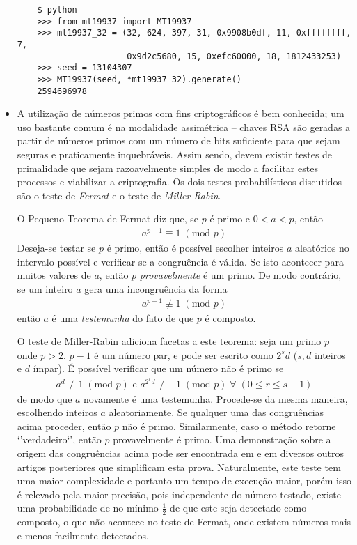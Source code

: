 \documentclass{article}
\begin{document}
\begin{itemize}
\begin{verbatim}
    $ python
    >>> from mt19937 import MT19937
    >>> mt19937_32 = (32, 624, 397, 31, 0x9908b0df, 11, 0xffffffff, 7,
                      0x9d2c5680, 15, 0xefc60000, 18, 1812433253)
    >>> seed = 13104307
    >>> MT19937(seed, *mt19937_32).generate()
    2594696978
\end{verbatim}

\item A utilização de números primos com fins criptográficos é bem conhecida;
um uso bastante comum é na modalidade assimétrica -- chaves RSA são geradas a
partir de números primos com um número de bits suficiente para que sejam
seguras e praticamente inquebráveis. Assim sendo, devem existir testes de
primalidade que sejam razoavelmente simples de modo a facilitar estes
processos e viabilizar a criptografia. Os dois testes probabilísticos
discutidos são o teste de \emph{Fermat} e o teste de \emph{Miller-Rabin}.

O Pequeno Teorema de Fermat diz que, se $p$ é primo e $0 < a < p$, então
\begin{align*}
a^{p-1} \equiv 1 \; (\textrm{mod } p)
\end{align*}
Deseja-se testar se $p$ é primo, então é possível escolher inteiros $a$
aleatórios no intervalo possível e verificar se a congruência é válida. Se
isto acontecer para muitos valores de $a$, então $p$ \emph{provavelmente} é um
primo. De modo contrário, se um inteiro $a$ gera uma incongruência da forma
\begin{align*}a^{p-1} \not\equiv 1 \; (\textrm{mod } p)\end{align*}
então $a$ é uma \emph{testemunha} do fato de que $p$ é composto.

O teste de Miller-Rabin adiciona facetas a este teorema: seja um primo $p$
onde $p > 2$. $p - 1$ é um número par, e pode ser escrito como $2^s d$ ($s,
d$ inteiros e $d$ ímpar). É possível verificar que um número não é primo se
\begin{align*}
a^d \not\equiv 1 \; (\textrm{mod } p) \textrm{ e }
a^{2^{r}d} \not\equiv -1 \; (\textrm{mod } p) \;\forall\; (0 \leq r \leq s-1)
\end{align*}
de modo que $a$ novamente é uma testemunha. Procede-se da mesma maneira,
escolhendo inteiros $a$ aleatoriamente. Se qualquer uma das congruências acima
proceder, então $p$ não é primo. Similarmente, caso o método retorne
`'verdadeiro`', então $p$ provavelmente é primo. Uma demonstração sobre a
origem das congruências acima pode ser encontrada em
\cite{Miller:1976:RHT:1739937.1740086} e em diversos outros artigos
posteriores que simplificam esta prova. Naturalmente, este teste tem uma
maior complexidade e portanto um tempo de execução maior, porém isso é
relevado pela maior precisão, pois independente do número testado, existe
uma probabilidade de no mínimo $\frac{1}{2}$ de que este seja detectado como
composto, o que não acontece no teste de Fermat, onde existem números
mais e menos facilmente detectados.


\end{itemize}
\end{document}

